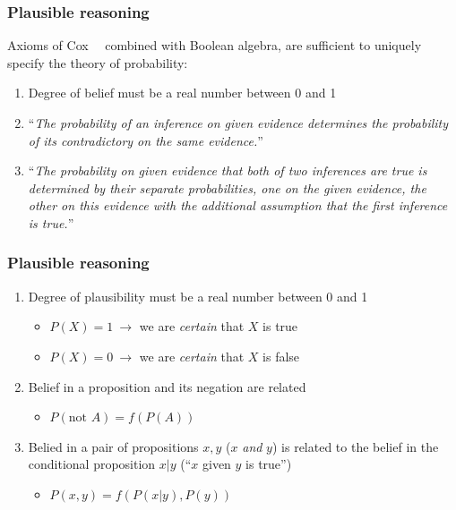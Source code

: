 \begin{frame}

\frametitle{Plausible reasoning}
\label{plausiblereasoning}

Axioms of Cox~\citep{Cox:1946}~\citep{Cox:1961} combined with Boolean algebra, are sufficient to uniquely
specify the theory of probability:

\begin{enumerate}
\item Degree of belief must be a real number between 0 and 1

\item ``\emph{The probability of an inference on given evidence determines the probability of its
contradictory on the same evidence.}''

\item ``\emph{The probability on given evidence that both of two inferences are true is determined by their
separate probabilities, one on the given evidence, the other on this evidence with the additional
assumption that the first inference is true.}''

\end{enumerate}

\end{frame}

\begin{frame}

\frametitle{Plausible reasoning}
\label{plausiblereasoning}

\begin{enumerate}
\item Degree of plausibility must be a real number between 0 and 1

\begin{itemize}
\item $P(X) = 1~\rightarrow$ we are \emph{certain} that $X$ is true

\item $P(X) = 0~\rightarrow$ we are \emph{certain} that $X$ is false

\end{itemize}

\item Belief in a proposition and its negation are related

\begin{itemize}
\item $P(\text{not } A) = f(P(A))$

\end{itemize}

\item Belied in a pair of propositions $x,y$ ($x$ \emph{and} $y$) is related to the belief in the
conditional proposition $x|y$ (``$x$ given $y$ is true'')

\begin{itemize}
\item $P(x,y) = f(P(x|y), P(y))$

\end{itemize}

\end{enumerate}

\end{frame}

